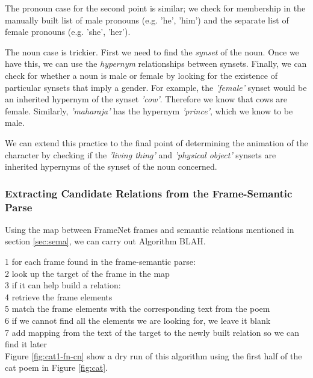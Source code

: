 The pronoun case for the second point is similar; we check for membership in the manually built list of male pronouns (e.g. 'he', 'him') and the separate list of female pronouns (e.g. 'she', 'her'). 

The noun case is trickier. First we need to find the \textit{synset} of the noun. Once we have this, we can use the \textit{hypernym} relationships between synsets. Finally, we can check for whether a noun is male or female by looking for the existence of particular synsets that imply a gender. For example, the \textit{'female'} synset would be an inherited hypernym of the synset \textit{'cow'}. Therefore we know that cows are female. Similarly, \textit{'maharaja'} has the hypernym \textit{'prince'}, which we know to be male.

We can extend this practice to the final point of determining the animation of the character by checking if the \textit{'living thing'} and \textit{'physical object'} synsets are inherited hypernyms of the synset of the noun concerned.


\subsubsection{Extracting Candidate Relations from the Frame-Semantic Parse}
\label{sec:candidate}

Using the map between FrameNet frames and semantic relations mentioned in section \ref{sec:sema}, we can carry out Algorithm BLAH.

1 for each frame found in the frame-semantic parse:\\
2	look up the target of the frame in the map\\
3	if it can help build a relation:	\\
4		retrieve the frame elements\\
5		match the frame elements with the corresponding text from the poem\\
6			if we cannot find all the elements we are looking for, we leave it blank\\
7		add mapping from the text of the target to the newly built relation so we can find it later\\
	
Figure \ref{fig:cat1-fn-cn} show a dry run of this algorithm using the first half of the cat poem in Figure \ref{fig:cat}.

